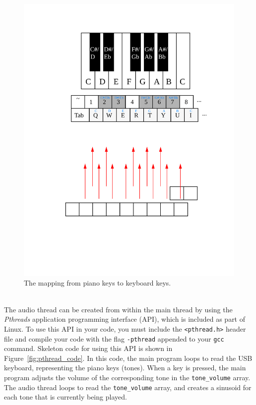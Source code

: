 \documentclass[epsfig,10pt,fullpage]{article}
\begin{document}
\begin{figure}[H]
   \begin{center}
			  \includegraphics[scale=0.5]{figures/keyboard_layout.pdf}
   \end{center}
   \caption{The mapping from piano keys to keyboard keys.}
	\label{fig:keyboard_layout}
\end{figure}

~\\
\noindent
The audio thread can be created from within the main thread by using the
{\it Pthreads} application programming interface (API), which is included as part of Linux. 
To use this API in your code, you must include the \texttt{<pthread.h>} header file and
compile your code with the flag \texttt{-pthread} appended to your \texttt{gcc} command. 
Skeleton code for
using this API is shown in Figure~\ref{fig:pthread_code}. In this code, the main program
loops to read the USB keyboard, representing the piano keys (tones). When a key is pressed, the
main program adjusts the volume of the corresponding tone in the \texttt{tone\_volume} array.
The audio thread loops to read the \texttt{tone\_volume} array, and creates a sinusoid for
each tone that is currently being played.
\end{document}
